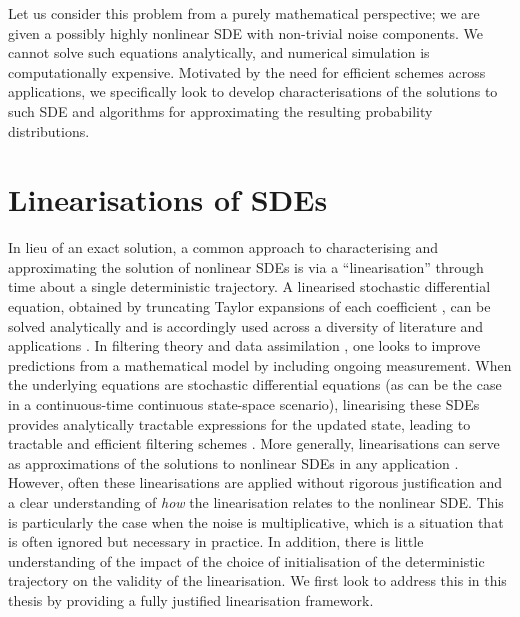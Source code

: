 Let us consider this problem from a purely mathematical perspective; we are given a possibly highly nonlinear SDE with non-trivial noise components.
We cannot solve such equations analytically, and numerical simulation is computationally expensive.
Motivated by the need for efficient schemes across applications, we specifically look to develop characterisations of the solutions to such SDE and algorithms for approximating the resulting probability distributions.


\section{Linearisations of SDEs}
In lieu of an exact solution, a common approach to characterising and approximating the solution of nonlinear SDEs is via a ``linearisation'' through time about a single deterministic trajectory.
A linearised stochastic differential equation, obtained by truncating Taylor expansions of each coefficient \citep[e.g.]{Jazwinski_2014_StochasticProcessesFiltering,Blagoveshchenskii_1962_DiffusionProcessesDepending}, can be solved analytically and is accordingly used across a diversity of literature and applications \citep[e.g.]{Jazwinski_2014_StochasticProcessesFiltering,Sanz-AlonsoStuart_2017_GaussianApproximationsSmall,SarkkaSolin_2019_AppliedStochasticDifferential,KaszasHaller_2020_UniversalUpperEstimate}.
In filtering theory and data assimilation \citep{LawEtAl_2015_DataAssimilationMathematical,ReichCotter_2015_ProbabilisticForecastingBayesian,BudhirajaEtAl_2019_AssimilatingDataModels}, one looks to improve predictions from a mathematical model by including ongoing measurement.
When the underlying equations are stochastic differential equations (as can be the case in a continuous-time continuous state-space scenario), linearising these SDEs provides analytically tractable expressions for the updated state, leading to tractable and efficient filtering schemes \citep{Jazwinski_2014_StochasticProcessesFiltering}.
More generally, linearisations can serve as approximations of the solutions to nonlinear SDEs in any application \citep{SarkkaSolin_2019_AppliedStochasticDifferential}.
However, often these linearisations are applied without rigorous justification and a clear understanding of \emph{how} the linearisation relates to the nonlinear SDE.
This is particularly the case when the noise is multiplicative, which is a situation that is often ignored but necessary in practice.
In addition, there is little understanding of the impact of the choice of initialisation of the deterministic trajectory on the validity of the linearisation.
We first look to address this in this thesis by providing a fully justified linearisation framework.

